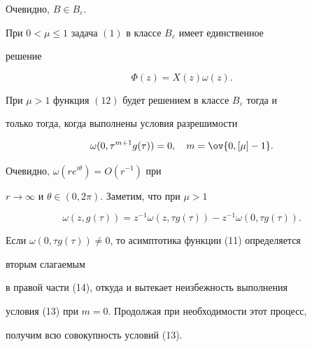 Очевидно, $B\in B_\varepsilon$. 


 


 


\begin{lem} 


При $0<\mu\le1$ задача $(1)$ в классе $B_\varepsilon$ имеет единственное 


решение 


\begin{equation} 


\Phi(z)=X(z)\omega(z). 


\end{equation} 


При $\mu>1$ функция $(12)$ будет решением в классе $B_\varepsilon$ тогда и 


только тогда, когда выполнены условия разрешимости 


\begin{equation} 


\omega(0,\tau^{m+1}g(\tau))=0,\quad m=\ov{0,[\mu]-1}. 


\end{equation} 


\end{lem} 





\begin{pf} 


Очевидно, $\omega(re^{i\theta})=O(r^{-1})$ при 


$r\to\infty$ и $\theta\in(0,2\pi)$. Заметим, что при $\mu>1$ 


\begin{equation} 


\omega(z,g(\tau))=z^{-1}\omega(z,\tau g(\tau))-z^{-1} 


\omega(0,\tau g(\tau)). 


\end{equation} 


Если $\omega(0,\tau g(\tau))\ne0$, то асимптотика функции (11) определяется 


вторым слагаемым 


в правой части (14), откуда и вытекает неизбежность выполнения 


условия (13) при $m=0$. Продолжая при необходимости этот процесс, 


получим всю совокупность условий (13). 


\end{pf}


